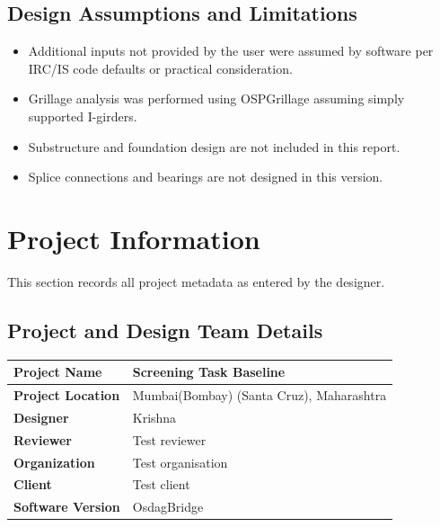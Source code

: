 \documentclass[12pt,a4paper]{report}
\numberwithin{table}{chapter}
\numberwithin{figure}{chapter}
\begin{document}
\section*{Design Assumptions and Limitations}
\label{sec:assumptions}

\begin{itemize}
\item Additional inputs not provided by the user were assumed by software per IRC/IS code defaults or practical consideration.
\item Grillage analysis was performed using OSPGrillage assuming simply supported I-girders.
\item Substructure and foundation design are not included in this report.
\item Splice connections and bearings are not designed in this version.
\end{itemize}

\titleformat{\chapter}[block]{\normalfont\Large\bfseries\centering}{\thechapter}{1em}{}
\titlespacing*{\chapter}{0pt}{-30pt}{10pt}


\chapter{Project Information}

This section records all project metadata as entered by the designer.

\section{Project and Design Team Details}
\label{sec:project-details}

\begin{tabular}{|L{5.5cm}|L{8.5cm}|}
\hline
\textbf{Project Name} & Screening Task Baseline \\
\hline
\textbf{Project Location} & Mumbai(Bombay) (Santa Cruz), Maharashtra \\
\hline
\textbf{Designer} & Krishna \\
\hline
\textbf{Reviewer} & Test reviewer \\
\hline
\textbf{Organization} & Test organisation \\
\hline
\textbf{Client} & Test client \\
\hline
\textbf{Software Version} & OsdagBridge \\
\hline
\end{tabular}
\end{document}
